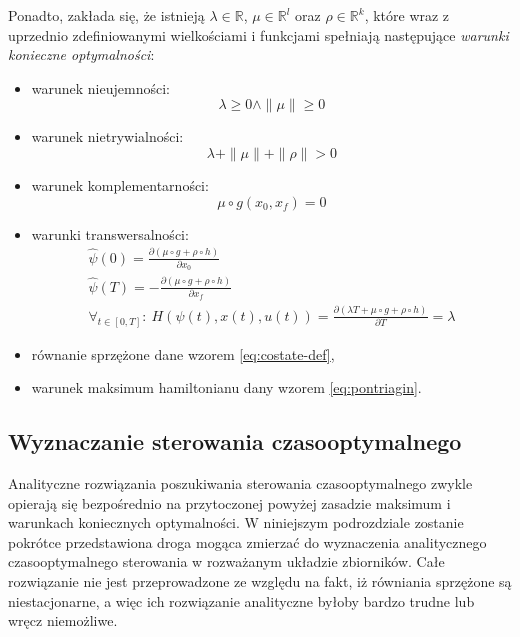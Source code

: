 Ponadto, zakłada się, że istnieją $\lambda \in \mathbb{R}$, $\mu \in \mathbb{R}^{l}$ oraz $\rho \in \mathbb{R}^{k}$, które wraz z uprzednio zdefiniowanymi wielkościami i funkcjami spełniają następujące \emph{warunki konieczne optymalności}:
\begin{itemize}
    \item warunek nieujemności:
    \begin{equation}\label{eq:pontryagin-noneg}
    \lambda \geq 0 \land \|\mu\| \geq 0
    \end{equation}
    \item warunek nietrywialności:
    \begin{equation}\label{eq:pontryagin-notriv}
    \lambda + \|\mu\| + \|\rho\| > 0
    \end{equation}
    \item warunek komplementarności:
    \begin{equation}\label{eq:pontryagin-comp}
    \mu \circ g(x_{0}, x_{f}) = 0
    \end{equation}
    \item warunki transwersalności:
    \begin{equation}\label{eq:pontryagin-trans}
    \begin{array}{lr}
        \hat{\psi}(0) = \frac{\partial (\mu \circ g + \rho \circ h)}{\partial x_{0}}\\[8pt]
        \hat{\psi}(T) = - \frac{\partial (\mu \circ g + \rho \circ h)}{\partial x_{f}}\\[8pt]
        \forall_{t \in [0, T]}:~ H(\psi(t), x(t), u(t)) = \frac{\partial (\lambda T + \mu \circ g + \rho \circ h)}{\partial T} = \lambda
    \end{array}
    \end{equation}
    \item równanie sprzężone dane wzorem \ref{eq:costate-def},
    \item warunek maksimum hamiltonianu dany wzorem \ref{eq:pontriagin}.
\end{itemize}

\subsection{Wyznaczanie sterowania czasooptymalnego}
\label{sub:toc-ctrl}

Analityczne rozwiązania poszukiwania sterowania czasooptymalnego zwykle opierają się bezpośrednio na przytoczonej powyżej zasadzie maksimum i warunkach koniecznych optymalności. W niniejszym podrozdziale zostanie pokrótce przedstawiona droga mogąca zmierzać do wyznaczenia analitycznego czasooptymalnego sterowania w rozważanym układzie zbiorników. Całe rozwiązanie nie jest przeprowadzone ze względu na fakt, iż równiania sprzężone są niestacjonarne, a więc ich rozwiązanie analityczne byłoby bardzo trudne lub wręcz niemożliwe.

